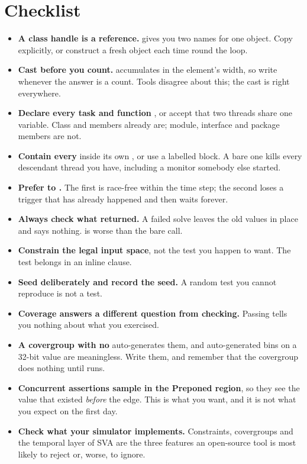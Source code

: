 \section{Checklist}
\label{sec:toolkit:checklist}

\begin{itemize}
  \item \textbf{A class handle is a reference.}  gives you two
        names for one object. Copy explicitly, or construct a fresh object
        each time round the loop.
  \item \textbf{Cast before you count.}  accumulates in the
        element's width, so write  whenever
        the answer is a count. Tools disagree about this; the cast is right
        everywhere.
  \item \textbf{Declare every task and function} , or accept
        that two threads share one variable. Class and  members
        already are; module, interface and package members are not.
  \item \textbf{Contain every } inside its own
        , or use a labelled block. A bare one kills every
        descendant thread you have, including a monitor somebody else started.
  \item \textbf{Prefer  to .} The first is
        race-free within the time step; the second loses a trigger that has
        already happened and then waits forever.
  \item \textbf{Always check what  returned.} A failed
        solve leaves the old values in place and says nothing.
         is worse than the bare call.
  \item \textbf{Constrain the legal input space}, not the test you happen to
        want. The test belongs in an inline  clause.
  \item \textbf{Seed deliberately and record the seed.} A random test you
        cannot reproduce is not a test.
  \item \textbf{Coverage answers a different question from checking.} Passing
        tells you nothing about what you exercised.
  \item \textbf{A covergroup with no } auto-generates them, and
        auto-generated bins on a 32-bit value are meaningless. Write them,
        and remember that the covergroup does nothing until  runs.
  \item \textbf{Concurrent assertions sample in the Preponed region}, so they
        see the value that existed \emph{before} the edge. This is what you
        want, and it is not what you expect on the first day.
  \item \textbf{Check what your simulator implements.} Constraints,
        covergroups and the temporal layer of SVA are the three features an
        open-source tool is most likely to reject or, worse, to ignore.
\end{itemize}
